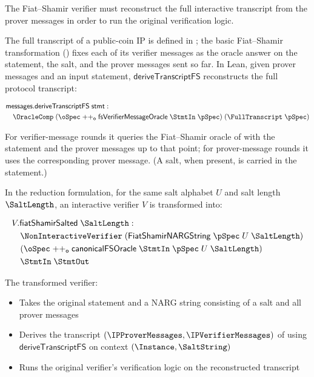 The Fiat--Shamir verifier must reconstruct the full interactive transcript from the prover messages in order to run the original verification logic.

The full transcript of a public-coin IP is defined in ; the basic
Fiat--Shamir transformation () fixes each of its
verifier messages as the oracle answer on the statement, the salt, and the prover messages sent
so far. In Lean, given prover messages and an input statement, \(\mathsf{deriveTranscriptFS}\)
reconstructs the full protocol transcript:

\begin{equation*}
\begin{aligned}
  &\mathsf{messages}.\mathsf{deriveTranscriptFS}\;\mathsf{stmt} :\\
  &\quad\OracleComp\;(\oSpec\mathrel{++_\mathsf{o}}\mathsf{fsVerifierMessageOracle}\;\StmtIn\;\pSpec)
    \;(\FullTranscript\;\pSpec)
\end{aligned}
\end{equation*}

For verifier-message rounds it queries the Fiat--Shamir oracle of
 with the statement and the prover messages up to that
point; for prover-message rounds it uses the corresponding prover message. (A salt, when
present, is carried in the statement.)

\begin{definition}
    \label{def:verifier_fiat_shamir}
    In the reduction formulation, for the same salt alphabet \(U\) and salt length \(\SaltLength\), an interactive verifier \(V\) is transformed into:

    \begin{equation*}
    \begin{aligned}
      &V.\mathsf{fiatShamirSalted}\;\SaltLength :\\
      &\quad\NonInteractiveVerifier\;(\mathsf{FiatShamirNARGString}\;\pSpec\;U\;\SaltLength)\\
      &\quad(\oSpec\mathrel{++_\mathsf{o}}\mathsf{canonicalFSOracle}\;\StmtIn\;\pSpec\;U\;\SaltLength)\\
      &\quad\StmtIn\;\StmtOut
    \end{aligned}
    \end{equation*}

    The transformed verifier:
    \begin{itemize}
        \item Takes the original statement and a NARG string consisting of a salt and all prover messages
        \item Derives the transcript \((\IPProverMessages,\IPVerifierMessages)\) of
         using \(\mathsf{deriveTranscriptFS}\) on context \((\Instance,\SaltString)\)
        \item Runs the original verifier's verification logic on the reconstructed transcript
    \end{itemize}
\end{definition}

